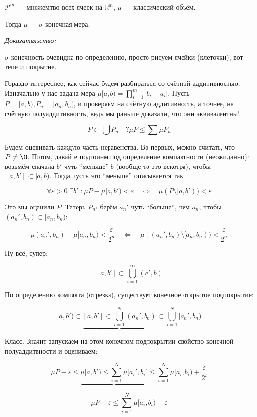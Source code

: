 \documentclass{article}
\def\dbl{\,\,}
\begin{document}
$\mathcal{P}^m$ --- множемтво всех ячеек на $\mathbb{R}^m$, $\mu$ --- классический объём.

Тогда $\mu$ --- $\sigma$-конечная мера.

\textit{Доказательство:}

$\sigma$-конечность очевидна по определению, просто рисуем ячейки (клеточки), вот тепе и покрытие.

Гораздо интереснее, как сейчас будем разбираться со счётной аддитивностью. Изначально у нас задана мера $\mu[a, b) = \prod_{i = 1}^{m} |b_i - a_i|$. Пусть $P = [a, b), P_n = [a_n, b_n)$, и проверяем на счётную аддитивность, а точнее, на счётную полуаддитивность, ведь мы раньше доказали, что они эквивалентны! 

\[P \subset \bigcup P_n \quad ? \mu P \le \sum \mu P_n\]

Будем оценивать каждую часть неравенства. Во-первых, можно считать, что $P \neq \O$. Потом, давайте подгоинм под определение компактности (неожиданно): возьмём сначала $b'$ чуть ``меньше'' $b$ (вообще-то это векотра), чтобы $[a, b'] \subset [a, b)$. Тогда пусть это ``меньше'' описывается так:

\[\forall \varepsilon > 0 \dbl \exists b' \dbl: \mu P - \mu [a, b') < \varepsilon \quad \Leftrightarrow \quad \mu(P \setminus [a, b')) < \varepsilon\]

Это мы оценили $P$. Теперь $P_n$: берём $a_n'$ чуть ``больше'', чем $a_n$, чтобы $(a_n', b_n) \subset [a_n, b_n)$:

\[\mu (a_n', b_n) - \mu [a_n, b_n) < \frac{\varepsilon}{2^n} \quad \Leftrightarrow \quad \mu((a_n', b_n) \setminus [a_n, b_n)) < \frac{\varepsilon}{2^n}\]

Ну всё, супер: 

\[[a, b'] \subset \bigcup_{i = 1}^{\infty} (a', b)\]

По определению компакта (отрезка), существует конечное открытое подпокрытие: 

\[[a, b') \subset \underbrace{[a, b'] \subset \bigcup_{i = 1}^{N} (a_n', b_n)} \subset \bigcup_{i = 1}^{N} [a_n', b_n)\]

Класс. Значит запускаем на этом конечном подпокрытии свойство конечной полуаддитвности и оцениваем:

\[ \mu P - \varepsilon \le \underbrace{\mu [a, b') \le \sum_{i = 1}^{N} \mu [a_i', b_i)} \le \sum_{i = 1}^{N} \mu [a_i, b_i) + \frac{\varepsilon}{2^i}\]

\[\mu P - \varepsilon \le \sum_{i = 1}^{N} \mu [a_i, b_i) + \varepsilon\]
\end{document}
